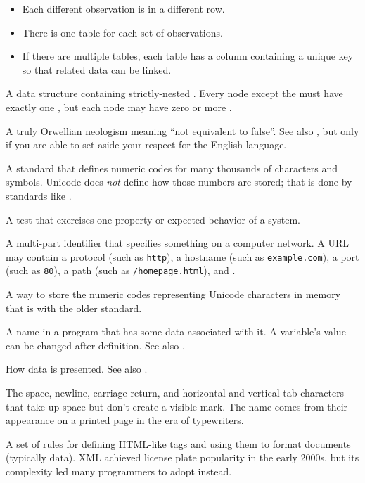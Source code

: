 \begin{description}
\begin{itemize}
\item
  Each different observation is in a different row.

\item
  There is one table for each set of observations.

\item
  If there are multiple tables,
  each table has a column containing a unique key
  so that related data can be linked.
\end{itemize}

A data structure containing strictly-nested . Every node
except the  must have exactly one , but each node may have zero or more
.

A truly Orwellian neologism meaning ``not equivalent to false''. See also
, but only if you are able to set aside your respect for the
English language.

A standard that defines numeric codes for many thousands of characters and
symbols. Unicode does \emph{not} define how those numbers are stored; that is done
by standards like .

A test that exercises one property or expected behavior of a system.

A multi-part identifier that specifies something on a computer network. A URL
may contain a protocol (such as \texttt{http}), a hostname (such as \texttt{example.com}),
a port (such as \texttt{80}),
a path (such as \texttt{/homepage.html}),
and .

A way to store the numeric codes representing Unicode characters in memory
that is  with the older
 standard.

A name in a program that has some data associated with it. A variable's value
can be changed after definition. See also .

How data is presented.
See also .

The space, newline, carriage return, and horizontal and vertical tab characters
that take up space but don't create a visible mark.  The name comes from their
appearance on a printed page in the era of typewriters.

A set of rules for defining HTML-like tags and using them to format documents
(typically data). XML achieved license plate popularity in the early 2000s,
but its complexity led many programmers to adopt  instead.

\end{description}
